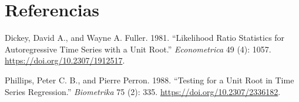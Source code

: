 \documentclass[11pt,]{article}
\begin{document}
\newpage

\hypertarget{referencias}{%
\section{Referencias}\label{referencias}}

\setlength{\parindent}{-0.2in}
\setlength{\leftskip}{0.2in}
\setlength{\parskip}{8pt}
\vspace*{-0.2in}

\noindent

\hypertarget{refs}{}
\leavevmode\hypertarget{ref-Dickey1981}{}%
Dickey, David A., and Wayne A. Fuller. 1981. ``Likelihood Ratio
Statistics for Autoregressive Time Series with a Unit Root.''
\emph{Econometrica} 49 (4): 1057. \url{https://doi.org/10.2307/1912517}.

\leavevmode\hypertarget{ref-Phillips1988}{}%
Phillips, Peter C. B., and Pierre Perron. 1988. ``Testing for a Unit
Root in Time Series Regression.'' \emph{Biometrika} 75 (2): 335.
\url{https://doi.org/10.2307/2336182}.




\newpage
\singlespacing 
\end{document}
